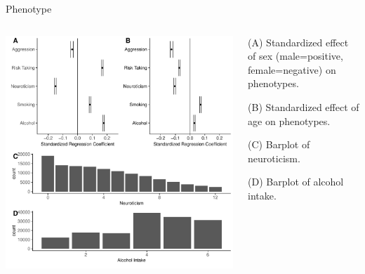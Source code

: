\documentclass{beamer}
\begin{document}
  \begin{frame}[t]{Phenotype}
    \begin{center}

      \begin{columns}
        \begin{column}{0.5\textwidth}
          \includegraphics[width=1\linewidth]{../ukb_assoc/figure/phenotype/descriptives_plots.pdf}
        \end{column}
        \begin{column}{0.5\textwidth}
          \begin{itemize}
            {\small
            \item (A) Standardized effect of sex (male=positive, female=negative) on phenotypes. 
            \item (B) Standardized effect of age on phenotypes.
            \item (C) Barplot of neuroticism.
            \item (D) Barplot of alcohol intake.
            }
        \end{itemize}
      \end{column}
    \end{columns}
  \end{center}
\end{frame}
\end{document}
